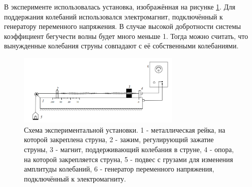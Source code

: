 \documentclass[12pt]{article}
\begin{document}
В эксперименте использовалась установка, изображённая на рисунке \ref{fig:1}. Для поддержания колебаний использовался электромагнит, подключённый 
к генератору переменного напряжения. В случае высокой добротности системы коэффициент бегучести волны будет много меньше 1. Тогда можно считать, что
вынужденные колебания струны совпадают с её собственными колебаниями.
\begin{figure}
    \begin{center}
        \includegraphics[width=0.7\textwidth]{img.png}
    \end{center}
    \caption{Схема экспериментальной установки. 1 - металлическая рейка, на которой закреплена струна,
        2 - зажим, регулирующий зажатие струны, 3 - магнит, поддерживающий колебания в струне, 4 - опора, на которой закрепляется струна,
        5 - подвес с грузами для изменения амплитуды колебаний, 6 - генератор переменного напряжения, подключённый к электромагниту.}
    \label{fig:1}
\end{figure}
\end{document}
